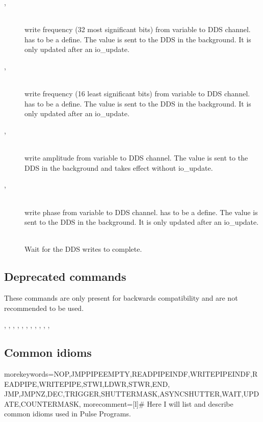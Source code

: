 \documentclass[11pt]{scrartcl}
\begin{document}
\begin{addmargin}{1cm}
\begin{description}
\item[ , ] \hfill\\ 
write frequency (32 most significant bits) from variable to DDS channel.  has to be a define. The value is sent to the DDS in the background. It is only updated after an io\_update. 

\item[ , ] \hfill\\ 
 write frequency (16 least significant bits) from variable to DDS channel.   has to be a define. The value is sent to the DDS in the background. It is only updated after an io\_update. 

\item[ , ] \hfill\\ 
 write amplitude from variable to DDS channel. The value is sent to the DDS in the background and takes effect without io\_update. 

\item[ , ] \hfill\\ 
write phase from variable to DDS channel.   has to be a define. The value is sent to the DDS in the background. It is only updated after an io\_update. 

\item[]\hfill\\
Wait for the DDS writes to complete.

\end{description}
\end{addmargin}

\subsection{Deprecated commands}
These commands are only present for backwards compatibility and are not recommended to be used.
\begin{addmargin}{1cm}
, , , , , , , , , , , \lit*{[CMP1}
\end{addmargin}

\subsection{Common idioms}
  { morekeywords={NOP,JMPPIPEEMPTY,READPIPEINDF,WRITEPIPEINDF,READPIPE,WRITEPIPE,STWI,LDWR,STWR,END,
    JMP,JMPNZ,DEC,TRIGGER,SHUTTERMASK,ASYNCSHUTTER,WAIT,UPDATE,COUNTERMASK},
 morecomment=[l]{\#}
}
\newcommand*{\Comment}[1]{\hfill\makebox[0.5\textwidth][l]{\parbox{0.5\textwidth}{\color{green}#1}}}%
Here I will list and describe common idioms used in Pulse Programs.
\end{document}
